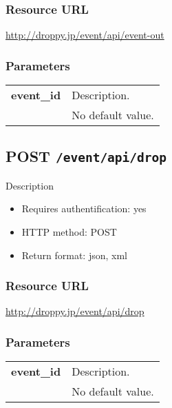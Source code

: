\documentclass[11pt,a4paper]{article}
\newcommand{\content}[1]{\begin{minipage}{10cm}\vspace{2mm}#1\vspace{2mm}\end{minipage}}
\begin{document}
  \subsubsection*{Resource URL}
  \url{http://droppy.jp/event/api/event-out}
  \subsubsection*{Parameters}
  \begin{table}[h]
    \begin{center}
      \begin{tabular}{l l}
        \hline 
      \textbf{event\_id} & \content{Description. }
      \\
       & No default value.\\
      \hline
      \end{tabular}
    \end{center}
  \end{table}
  
      \newpage
      
      
  \subsection*{POST {\tt /event/api/drop}}
  Description
  \begin{itemize}
  \item Requires authentification: yes
  \item HTTP method: POST
  \item Return format: json, xml
  \end{itemize}
  \subsubsection*{Resource URL}
  \url{http://droppy.jp/event/api/drop}
  \subsubsection*{Parameters}
  \begin{table}[h]
    \begin{center}
      \begin{tabular}{l l}
        \hline 
      \textbf{event\_id} & \content{Description. }
      \\
       & No default value.\\
      \hline
      \end{tabular}
    \end{center}
  \end{table}
  
\end{document}
